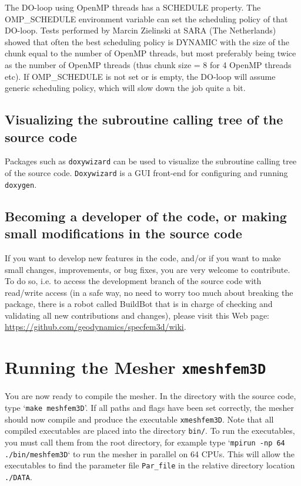 \documentclass[oneside,english]{book}
\begin{document}
The DO-loop using OpenMP threads has a SCHEDULE property. The OMP\_SCHEDULE
environment variable can set the scheduling policy of that DO-loop.
Tests performed by Marcin Zielinski at SARA (The Netherlands) showed that often
the best scheduling policy is DYNAMIC with the size of the chunk equal to the number of
OpenMP threads, but most preferably being twice as the number of
OpenMP threads (thus chunk size = 8 for 4 OpenMP threads etc).
If OMP\_SCHEDULE is not set or is empty, the DO-loop will assume generic
scheduling policy, which will slow down the job quite a bit.

\section{Visualizing the subroutine calling tree of the source code}

Packages such as \texttt{doxywizard} can be used to visualize the subroutine calling tree of the source code.
\texttt{Doxywizard} is a GUI front-end for configuring and running \texttt{doxygen}.

\section{Becoming a developer of the code, or making small modifications in the source code}

If you want to develop new features in the code, and/or if you want to make small changes, improvements, or bug fixes, you are very welcome to contribute. To do so, i.e. to access the development branch of the source code with read/write access (in a safe way, no need to worry too much about breaking the package, there is a robot called BuildBot that is in charge of checking and validating all new contributions and changes), please visit this Web page: \url{https://github.com/geodynamics/specfem3d/wiki}.


\chapter{\label{cha:Running-the-Mesher}Running the Mesher \texttt{xmeshfem3D}}

You are now ready to compile the mesher. In the directory with the
source code, type `\texttt{make meshfem3D}'. If all paths and flags
have been set correctly, the mesher should now compile and produce
the executable \texttt{xmeshfem3D}.
Note that all compiled executables are placed into the directory \texttt{bin/}.
To run the executables, you must call them from the root directory,
for example type `\texttt{mpirun -np 64 ./bin/meshfem3D}` to run the mesher
in parallel on 64 CPUs. This will allow the executables to find the parameter file
\texttt{Par\_file} in the relative directory location \texttt{./DATA}.
\end{document}

